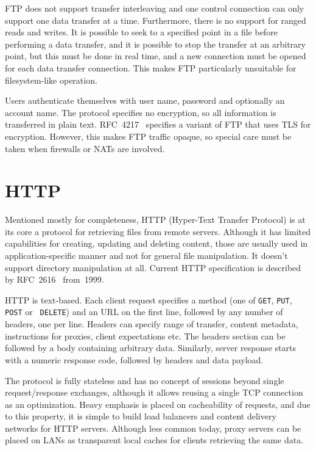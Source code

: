 FTP does not support transfer interleaving and one control connection can only support one data transfer at
a time. Furthermore, there is no support for ranged reads and writes.  It is possible to seek to a specified
point in a file before performing a data transfer, and it is possible to stop the transfer at an arbitrary
point, but this must be done in real time, and a new connection must be opened for each data transfer
connection. This makes FTP particularly unsuitable for filesystem-like operation.

Users authenticate themselves with user name, password and optionally an account name. The protocol specifies
no encryption, so all information is transferred in plain text. RFC~4217~\cite{rfc4217} specifies a variant of
FTP that uses TLS for encryption. However, this makes FTP traffic opaque, so special care must be taken when
firewalls or NATs are involved.

\section{HTTP}

Mentioned mostly for completeness, HTTP (Hyper-Text Transfer Protocol) is at its core a protocol for
retrieving files from remote servers. Although it has limited capabilities for creating, updating and deleting
content, those are usually used in application-specific manner and not for general file manipulation. It
doesn't support directory manipulation at all. Current HTTP specification is described by
RFC~2616~\cite{rfc2616} from~1999.

HTTP is text-based. Each client request specifies a method (one of {\tt GET}, {\tt PUT}, {\tt POST} or {\tt
DELETE}) and an URL on the first line, followed by any number of headers, one per line.  Headers can specify
range of transfer, content metadata, instructions for proxies, client expectations etc. The headers section
can be followed by a body containing arbitrary data. Similarly, server response starts with a numeric response
code, followed by headers and data payload.

The protocol is fully stateless and has no concept of sessions beyond single request/response exchanges,
although it allows reusing a single TCP connection as an optimization. Heavy emphasis is placed on
cacheability of requests, and due to this property, it is simple to build load balancers and content delivery
networks for HTTP servers. Although less common today, proxy servers can be placed on LANs as transparent
local caches for clients retrieving the same data.

